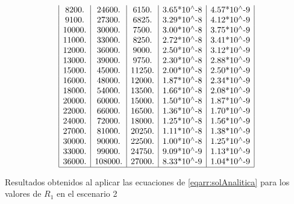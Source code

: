 \documentclass{llncs}
\begin{document}
\begin{table}[!h]
$$\begin{array}{|c|c|c|c|c|}
		8200. & 24600. & 6150.    & \text{3.65*10${}^{\wedge}$-8} & \text{4.57*10${}^{\wedge}$-9} \\
		9100. & 27300. & 6825.    & \text{3.29*10${}^{\wedge}$-8} & \text{4.12*10${}^{\wedge}$-9} \\
		10000. & 30000. & 7500.   & \text{3.00*10${}^{\wedge}$-8} & \text{3.75*10${}^{\wedge}$-9} \\
		11000. & 33000. & 8250.   & \text{2.72*10${}^{\wedge}$-8} & \text{3.41*10${}^{\wedge}$-9} \\
		12000. & 36000. & 9000.   & \text{2.50*10${}^{\wedge}$-8} & \text{3.12*10${}^{\wedge}$-9} \\
		13000. & 39000. & 9750.   & \text{2.30*10${}^{\wedge}$-8} & \text{2.88*10${}^{\wedge}$-9} \\
		15000. & 45000. & 11250.  & \text{2.00*10${}^{\wedge}$-8} & \text{2.50*10${}^{\wedge}$-9} \\
		16000. & 48000. & 12000.  & \text{1.87*10${}^{\wedge}$-8} & \text{2.34*10${}^{\wedge}$-9} \\
		18000. & 54000. & 13500.  & \text{1.66*10${}^{\wedge}$-8} & \text{2.08*10${}^{\wedge}$-9} \\
		20000. & 60000. & 15000.  & \text{1.50*10${}^{\wedge}$-8} & \text{1.87*10${}^{\wedge}$-9} \\
		22000. & 66000. & 16500.  & \text{1.36*10${}^{\wedge}$-8} & \text{1.70*10${}^{\wedge}$-9} \\
		24000. & 72000. & 18000.  & \text{1.25*10${}^{\wedge}$-8} & \text{1.56*10${}^{\wedge}$-9} \\
		27000. & 81000. & 20250.  & \text{1.11*10${}^{\wedge}$-8} & \text{1.38*10${}^{\wedge}$-9} \\
		30000. & 90000. & 22500.  & \text{1.00*10${}^{\wedge}$-8} & \text{1.25*10${}^{\wedge}$-9} \\
		33000. & 99000. & 24750.  & \text{9.09*10${}^{\wedge}$-9} & \text{1.13*10${}^{\wedge}$-9} \\
		36000. & 108000. & 27000. & \text{8.33*10${}^{\wedge}$-9} & \text{1.04*10${}^{\wedge}$-9} \\
		\hline
		\end{array}
		$$
		\caption{Resultados obtenidos al aplicar las ecuaciones de \ref{eqarr:solAnalitica} para los valores de $R_1$ en el escenario 2}
                \label{cuadro1}
	\end{table}
\end{document}
